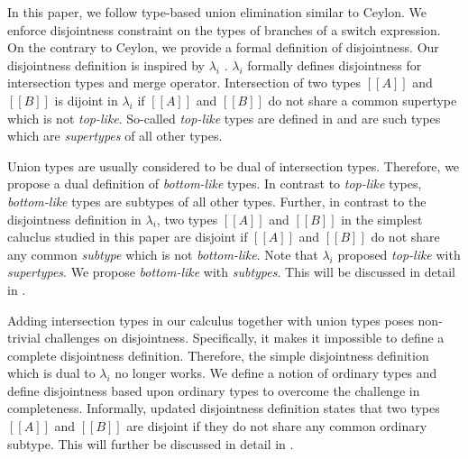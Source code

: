 In this paper, we follow type-based union elimination similar to Ceylon.
We enforce disjointness constraint on the types of branches of a switch
expression. On the contrary to Ceylon, we provide a formal definition
of disjointness. Our disjointness definition is inspired by $\lambda_{i}$ 
\cite{oliveira2016disjoint}. $\lambda_{i}$ formally defines disjointness
for intersection types and merge operator.
Intersection of two types $[[A]]$ and $[[B]]$ is dijoint in $\lambda_{i}$
if $[[A]]$ and $[[B]]$ do not share a common supertype which is not
\emph{top-like}. So-called \emph{top-like} types are defined in 
\cite{oliveira2016disjoint} and are such types which are \emph{supertypes}
of all other types.

Union types are usually considered to be dual of intersection types.
Therefore, we propose a dual definition of \emph{bottom-like} types.
In contrast to \emph{top-like} types, \emph{bottom-like} types are
subtypes of all other types. Further, in contrast to the disjointness
definition in $\lambda_{i}$, two types $[[A]]$ and $[[B]]$ in the simplest 
caluclus studied in this paper are disjoint if $[[A]]$ and $[[B]]$
do not share any common \emph{subtype} which is not \emph{bottom-like}.
Note that $\lambda_{i}$ proposed \emph{top-like} with \emph{supertypes}.
We propose \emph{bottom-like} with \emph{subtypes}. This will be discussed
in detail in .

Adding intersection types in our calculus
together with union types poses non-trivial challenges on disjointness.
Specifically, it makes it impossible to define a complete disjointness
definition. Therefore, the simple disjointness definition which is dual
to $\lambda_{i}$ no longer works. We define a notion of ordinary types
and define disjointness based upon ordinary types to overcome the
challenge in completeness. Informally, updated disjointness definition states
that two types $[[A]]$ and $[[B]]$ are disjoint if they do not share any
common ordinary subtype. This will further be discussed in detail in
.

